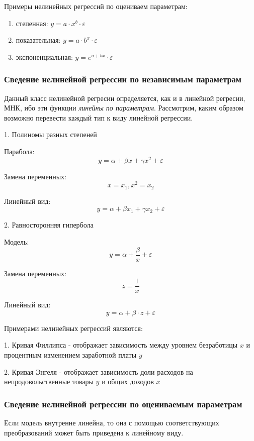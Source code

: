\documentclass[aps,%
12pt,%
final,%
oneside,
onecolumn,%
musixtex, %
superscriptaddress,%
centertags]{article} %
\begin{document}
Примеры нелинейных регрессий по оцениваем параметрам:
\begin{enumerate}
	\item степенная: $ y = a \cdot x^b \cdot \varepsilon $
	\item показательная: $ y = a \cdot b^x \cdot \varepsilon $
	\item экспоненциальная: $ y =e^{a+bx} \cdot \varepsilon $ 
\end{enumerate}
\subsubsection{Сведение нелинейной регрессии по независимым параметрам}

Данный класс нелинейной регресии определяется, как и в линейной регресии, МНК, ибо эти функции \textit{линейны по параметрам}. Рассмотрим, каким образом возможно перевести каждый тип к виду линейной регрессии.

\begin{center} 1. Полиномы разных степеней \end{center}

Парабола:
$$y = \alpha+ \beta x+\gamma x^2+\varepsilon$$

Замена переменных:
$$ x = x_1, x^2 = x_2 $$

Линейный вид:
$$ y = \alpha+ \beta x_1+\gamma x_2 +\varepsilon $$
\newpage

\begin{center} 2. Равносторонняя гипербола \end{center}

Модель:
$$y = \alpha+\frac{\beta}{x}+\varepsilon$$

Замена переменных:
$$ z = \frac{1}{x} $$

Линейный вид:
$$y = \alpha+ \beta \cdot z+\varepsilon$$

Примерами нелинейных регрессий являются:

1. Кривая Филлипса - отображает зависимость между уровнем безработицы $x$ и процентным изменением заработной платы $y$ 

2. Кривая Энгеля - отображает зависимость доли расходов на непродовольственные товары $y$ и общих доходов $x$

\subsubsection{Сведение нелинейной регрессии по оцениваемым параметрам}

Если модель внутренне линейна, то она с помощью соответствующих преобразований может быть приведена к линейному виду.
\end{document}
